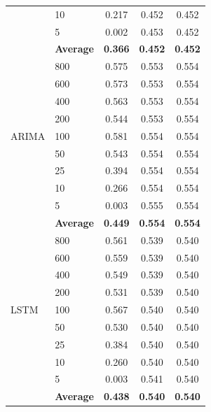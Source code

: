 \documentclass[11pt,a4paper]{article}
\begin{document}
\begin{table}[H]
\begin{tabular}{llccc}
 & 10  & 0.217 & 0.452 & 0.452 \\
 & 5   & 0.002 & 0.453 & 0.452 \\
 & \textbf{Average} & \textbf{0.366} & \textbf{0.452} & \textbf{0.452} \\
\midrule
\multirow{9}{*}{ARIMA}
 & 800 & 0.575 & 0.553 & 0.554 \\
 & 600 & 0.573 & 0.553 & 0.554 \\
 & 400 & 0.563 & 0.553 & 0.554 \\
 & 200 & 0.544 & 0.553 & 0.554 \\
 & 100 & 0.581 & 0.554 & 0.554 \\
 & 50  & 0.543 & 0.554 & 0.554 \\
 & 25  & 0.394 & 0.554 & 0.554 \\
 & 10  & 0.266 & 0.554 & 0.554 \\
 & 5   & 0.003 & 0.555 & 0.554 \\
 & \textbf{Average} & \textbf{0.449} & \textbf{0.554} & \textbf{0.554} \\
\midrule
\multirow{9}{*}{LSTM}
 & 800 & 0.561 & 0.539 & 0.540 \\
 & 600 & 0.559 & 0.539 & 0.540 \\
 & 400 & 0.549 & 0.539 & 0.540 \\
 & 200 & 0.531 & 0.539 & 0.540 \\
 & 100 & 0.567 & 0.540 & 0.540 \\
 & 50  & 0.530 & 0.540 & 0.540 \\
 & 25  & 0.384 & 0.540 & 0.540 \\
 & 10  & 0.260 & 0.540 & 0.540 \\
 & 5   & 0.003 & 0.541 & 0.540 \\
 & \textbf{Average} & \textbf{0.438} & \textbf{0.540} & \textbf{0.540} \\
\bottomrule
\end{tabular}
\end{table}
\end{document}
